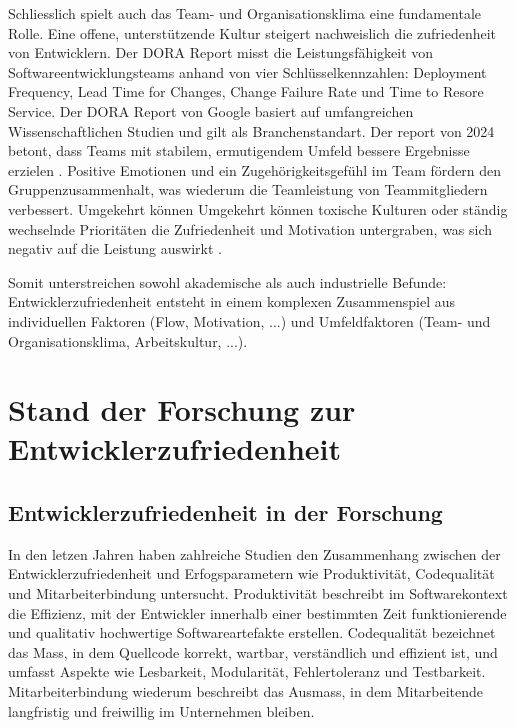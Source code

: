 \documentclass[12pt,a4paper]{report}
\begin{document}
Schliesslich spielt auch das Team- und Organisationsklima eine fundamentale Rolle. Eine offene, unterstützende Kultur steigert
nachweislich die zufriedenheit von Entwicklern. Der DORA Report misst die Leistungsfähigkeit von Softwareentwicklungsteams anhand
von vier Schlüsselkennzahlen: Deployment Frequency, Lead Time for Changes, Change Failure Rate und Time to Resore Service. Der DORA
Report von Google basiert auf umfangreichen Wissenschaftlichen Studien und gilt als Branchenstandart. Der report von 2024 betont,
dass Teams mit stabilem, ermutigendem Umfeld bessere Ergebnisse erzielen \cite{google_dora_2024}. Positive Emotionen und ein 
Zugehörigkeitsgefühl im Team fördern den Gruppenzusammenhalt, was wiederum die Teamleistung von Teammitgliedern verbessert. 
Umgekehrt können Umgekehrt können toxische Kulturen oder ständig wechselnde Prioritäten die Zufriedenheit und Motivation 
untergraben, was sich negativ auf die Leistung auswirkt \cite{sadowski_happiness_2019}.

Somit unterstreichen sowohl akademische als auch industrielle Befunde: Entwicklerzufriedenheit entsteht in einem komplexen
Zusammenspiel aus individuellen Faktoren (Flow, Motivation, ...) und Umfeldfaktoren (Team- und Organisationsklima, Arbeitskultur, 
...).

\section{Stand der Forschung zur Entwicklerzufriedenheit}

\subsection{Entwicklerzufriedenheit in der Forschung}

In den letzen Jahren haben zahlreiche Studien den Zusammenhang zwischen der Entwicklerzufriedenheit und Erfogsparametern wie 
Produktivität, Codequalität und Mitarbeiterbindung untersucht. Produktivität beschreibt im Softwarekontext die Effizienz, mit der
Entwickler innerhalb einer bestimmten Zeit funktionierende und qualitativ hochwertige Softwareartefakte erstellen. Codequalität
bezeichnet das Mass, in dem Quellcode korrekt, wartbar, verständlich und effizient ist, und umfasst Aspekte wie Lesbarkeit,
Modularität, Fehlertoleranz und Testbarkeit. Mitarbeiterbindung wiederum beschreibt das Ausmass, in dem Mitarbeitende langfristig
und freiwillig im Unternehmen bleiben.
\end{document}
